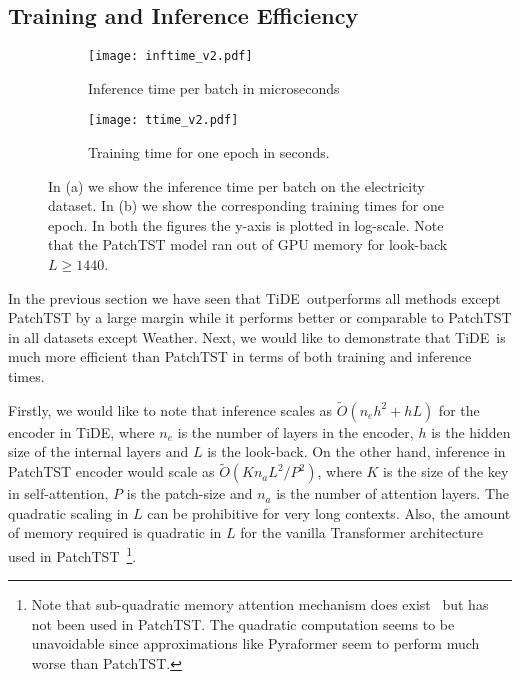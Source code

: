 \documentclass[10pt]{article} \usepackage[accepted]{tmlr}
\theoremstyle{plain}
\theoremstyle{definition}
\theoremstyle{remark}
\newcommand{\ours}{TiDE}
\begin{document}
\subsection{Training and Inference Efficiency} 

\begin{figure}[htbp]
  \centering
  \begin{subfigure}[b]{0.45\textwidth}
    \texttt{[image: inftime\_v2.pdf]}
    \caption{Inference time per batch in microseconds} \label{fig:inf}
  \end{subfigure}
  \hfill
  \begin{subfigure}[b]{0.45\textwidth}
\texttt{[image: ttime\_v2.pdf]}
    \caption{Training time for one epoch in seconds.}\label{tab:training}
  \end{subfigure}
  \caption{In (a) we show the inference time per batch on the electricity dataset. In (b) we show the corresponding training times for one epoch. In both the figures the y-axis is plotted in log-scale. Note that the PatchTST model ran out of GPU memory for look-back $L \geq 1440$.}
  \label{fig:timings}
\end{figure}

In the previous section we have seen that \ours~outperforms all methods except PatchTST by a large margin while it performs better or comparable to PatchTST in all datasets except Weather. Next, we would like to demonstrate that \ours~is much more efficient than PatchTST in terms of both training and inference times.

Firstly, we would like to note that inference scales as $\tilde{O}(n_eh^2 + hL)$ for the encoder in \ours, where $n_e$ is the number of layers in the encoder, $h$ is the hidden size of the internal layers and $L$ is the look-back. On the other hand, inference in PatchTST encoder would scale as $\tilde{O}(K n_aL^2/P^2)$, where $K$ is the size of the key in self-attention, $P$ is the patch-size and $n_a$ is the number of attention layers. The quadratic scaling in $L$ can be prohibitive for very long contexts. Also, the amount of memory required is quadratic in $L$ for the vanilla Transformer architecture used in PatchTST~\footnote{Note that sub-quadratic memory attention mechanism does exist~\citep{dao2022flashattention} but has not been used in PatchTST. The quadratic computation seems to be unavoidable since approximations like Pyraformer seem to perform much worse than PatchTST.}.
\end{document}
